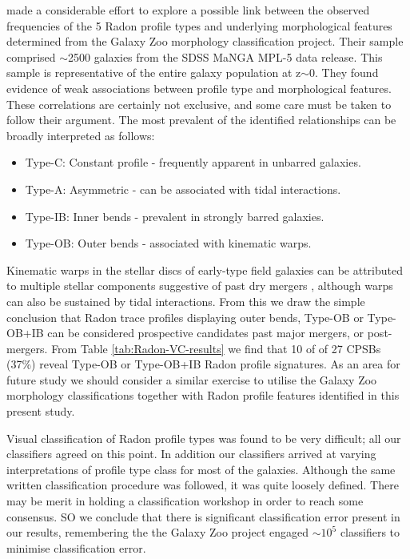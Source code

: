 \cite{2018MNRAS.480.2217S} made a considerable effort to explore a possible link between the observed frequencies of the 5 Radon profile types and underlying morphological features determined from the Galaxy Zoo morphology classification project. Their sample comprised $\sim$2500 galaxies from the SDSS MaNGA MPL-5 data release. This sample is representative of the entire galaxy population at z$\sim$0. They found evidence of weak associations between profile type and morphological features. These correlations are certainly not exclusive, and some care must be taken to follow their argument. The most prevalent of the identified relationships can be broadly interpreted as follows:
\begin{itemize}
    \item Type-C: Constant profile - frequently apparent in unbarred galaxies.
    \item Type-A: Asymmetric - can be associated with tidal interactions.
    \item Type-IB: Inner bends - prevalent in strongly barred galaxies.
    \item Type-OB: Outer bends - associated with kinematic warps.
\end{itemize}
Kinematic warps in the stellar discs of early-type field galaxies can be attributed to multiple stellar components suggestive of past dry mergers \citep{2005AJ....130.2647V}, although warps can also be sustained by tidal interactions.
From this we draw the simple conclusion that Radon trace profiles displaying outer bends, Type-OB or Type-OB+IB can be considered prospective candidates past major mergers, or post-mergers. From Table \ref{tab:Radon-VC-results} we find that 10 of of 27 CPSBs (37\%) reveal Type-OB or Type-OB+IB Radon profile signatures. 
As an area for future study we should consider a similar exercise to utilise the Galaxy Zoo morphology classifications together with Radon profile features identified in this present study. 

Visual classification of Radon profile types was found to be very difficult; all our classifiers agreed on this point. In addition our classifiers arrived at varying interpretations of profile type class for most of the galaxies. Although the same written classification procedure was followed, it was quite loosely defined. There may be merit in holding a classification workshop in order to reach some consensus. SO we conclude that there is significant classification error present in our results, remembering the the Galaxy Zoo project engaged $\sim10^5$ classifiers to minimise classification error.

